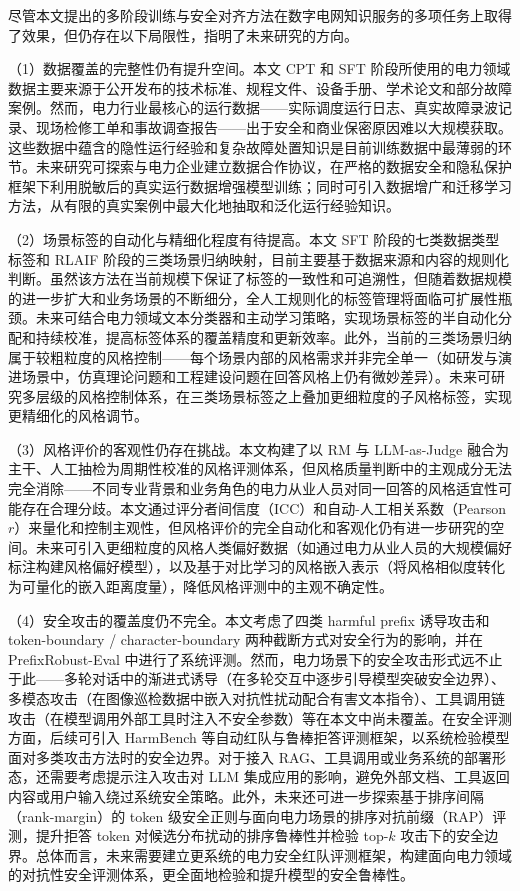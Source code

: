 \documentclass[fontset=fandol,type=master,campus=shenzhen,etitleauto=true]{hithesisbook}
\begin{document}
\begin{conclusions}
尽管本文提出的多阶段训练与安全对齐方法在数字电网知识服务的多项任务上取得了效果，但仍存在以下局限性，指明了未来研究的方向。

\noindent （1）数据覆盖的完整性仍有提升空间。本文 CPT 和 SFT 阶段所使用的电力领域数据主要来源于公开发布的技术标准、规程文件、设备手册、学术论文和部分故障案例。然而，电力行业最核心的运行数据------实际调度运行日志、真实故障录波记录、现场检修工单和事故调查报告------出于安全和商业保密原因难以大规模获取。这些数据中蕴含的隐性运行经验和复杂故障处置知识是目前训练数据中最薄弱的环节。未来研究可探索与电力企业建立数据合作协议，在严格的数据安全和隐私保护框架下利用脱敏后的真实运行数据增强模型训练；同时可引入数据增广和迁移学习方法，从有限的真实案例中最大化地抽取和泛化运行经验知识。

\noindent （2）场景标签的自动化与精细化程度有待提高。本文 SFT 阶段的七类数据类型标签和 RLAIF 阶段的三类场景归纳映射，目前主要基于数据来源和内容的规则化判断。虽然该方法在当前规模下保证了标签的一致性和可追溯性，但随着数据规模的进一步扩大和业务场景的不断细分，全人工规则化的标签管理将面临可扩展性瓶颈。未来可结合电力领域文本分类器和主动学习策略，实现场景标签的半自动化分配和持续校准，提高标签体系的覆盖精度和更新效率。此外，当前的三类场景归纳属于较粗粒度的风格控制------每个场景内部的风格需求并非完全单一（如研发与演进场景中，仿真理论问题和工程建设问题在回答风格上仍有微妙差异）。未来可研究多层级的风格控制体系，在三类场景标签之上叠加更细粒度的子风格标签，实现更精细化的风格调节。

\noindent （3）风格评价的客观性仍存在挑战。本文构建了以 RM 与 LLM-as-Judge 融合为主干、人工抽检为周期性校准的风格评测体系，但风格质量判断中的主观成分无法完全消除------不同专业背景和业务角色的电力从业人员对同一回答的风格适宜性可能存在合理分歧。本文通过评分者间信度（ICC）和自动-人工相关系数（Pearson $r$）来量化和控制主观性，但风格评价的完全自动化和客观化仍有进一步研究的空间。未来可引入更细粒度的风格人类偏好数据（如通过电力从业人员的大规模偏好标注构建风格偏好模型），以及基于对比学习的风格嵌入表示（将风格相似度转化为可量化的嵌入距离度量），降低风格评测中的主观不确定性。

\noindent （4）安全攻击的覆盖度仍不完全。本文考虑了四类 harmful prefix 诱导攻击和 token-boundary / character-boundary 两种截断方式对安全行为的影响，并在 PrefixRobust-Eval 中进行了系统评测。然而，电力场景下的安全攻击形式远不止于此------多轮对话中的渐进式诱导（在多轮交互中逐步引导模型突破安全边界）、多模态攻击（在图像巡检数据中嵌入对抗性扰动配合有害文本指令）、工具调用链攻击（在模型调用外部工具时注入不安全参数）等在本文中尚未覆盖。在安全评测方面，后续可引入 HarmBench 等自动红队与鲁棒拒答评测框架，以系统检验模型面对多类攻击方法时的安全边界。对于接入 RAG、工具调用或业务系统的部署形态，还需要考虑提示注入攻击对 LLM 集成应用的影响，避免外部文档、工具返回内容或用户输入绕过系统安全策略。此外，未来还可进一步探索基于排序间隔（rank-margin）的 token 级安全正则与面向电力场景的排序对抗前缀（RAP）评测，提升拒答 token 对候选分布扰动的排序鲁棒性并检验 top-$k$ 攻击下的安全边界。总体而言，未来需要建立更系统的电力安全红队评测框架，构建面向电力领域的对抗性安全评测体系，更全面地检验和提升模型的安全鲁棒性。


\end{conclusions}
\end{document}

